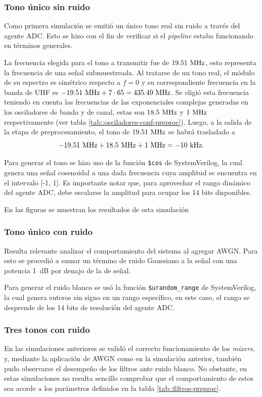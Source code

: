 \documentclass[../../main.tex]{subfiles}
\begin{document}
\subsubsection{Tono único sin ruido}

Como primera simulación se emitió un único tono real sin ruido a través del agente ADC. Esto se hizo con el fin de verificar si el \textit{pipeline} estaba funcionando en términos generales.

La frecuencia elegida para el tono a transmitir fue de $19.51~\textrm{MHz}$, esto representa la frecuencia de una señal submuestreada. Al tratarse de un tono real, el módulo de su espectro es simétrico respecto a $f = 0$ y su correspondiente frecuencia en la banda de UHF es $- 19.51~\textrm{MHz} + 7 \cdot 65 = 435.49~\textrm{MHz}$. Se eligió esta frecuencia teniendo en cuenta las frecuencias de las exponenciales complejas generadas en los osciladores de banda y de canal, estas son $18.5~\textrm{MHz}$ y $1~\textrm{MHz}$ respectivamente (ver tabla \ref{tab::osciladores-conf-preproc}). Luego, a la salida de la etapa de preprocesamiento, el tono de $19.51~\textrm{MHz}$ se habrá trasladado a 
\[ - 19.51~\textrm{MHz} + 18.5~\textrm{MHz} + 1~\textrm{MHz} = -10~\textrm{kHz}.\]

Para generar el tono se hizo uso de la función \texttt{\$cos} de SystemVerilog, la cual genera una señal cosenoidal a una dada frecuencia cuya amplitud se encuentra en el intervalo [-1, 1]. Es importante notar que, para aprovechar el rango dinámico del agente ADC, debe escalarse la amplitud para ocupar los 14 bits disponibles.

En las figuras  se muestran los resultados de esta simulación


\subsubsection{Tono único con ruido}
Resulta relevante analizar el comportamiento del sistema al agregar AWGN. Para esto se procedió a sumar un término de ruido Gaussiano a la señal con una potencia 1~dB por denajo de la de señal.

Para generar el ruido blanco se usó la función \texttt{\$urandom\_range} de SystemVerilog, la cual genera enteros sin signo en un rango específico, en este caso, el rango se desprende de los 14 bits de resolución del agente ADC.


\subsubsection{Tres tonos con ruido}
En las simulaciones anteriores se validó el correcto funcionamiento de los \textit{mixers}, y, mediante la aplicación de AWGN como en la simulación anterior, también pudo observarse el desempeño de los filtros ante ruido blanco. No obstante, en estas simulaciones no resulta sencillo comprobar que el comportamiento de estos sea acorde a los parámetros definidos en la tabla \ref{tab::filtros-preproc}.
\end{document}
